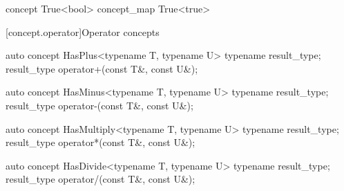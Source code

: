 \documentclass[american,twoside]{book}
\begin{document}
\begin{itemdecl}
concept True<bool> { }
concept_map True<true> { }
\end{itemdecl}

\begin{itemdescr}
\pnum
{}

\pnum
{}
\end{itemdescr}

[concept.operator]{Operator concepts}
\begin{itemdecl}
auto concept HasPlus<typename T, typename U> {
  typename result_type;
  result_type operator+(const T&, const U&);
}
\end{itemdecl}

\begin{itemdescr}
\pnum
{}
\end{itemdescr}

\begin{itemdecl}
auto concept HasMinus<typename T, typename U> {
  typename result_type;
  result_type operator-(const T&, const U&);
}
\end{itemdecl}

\begin{itemdescr}
\pnum
{}
\end{itemdescr}

\begin{itemdecl}
auto concept HasMultiply<typename T, typename U> {
  typename result_type;
  result_type operator*(const T&, const U&);
}
\end{itemdecl}

\begin{itemdescr}
\pnum
{}
\end{itemdescr}

\begin{itemdecl}
auto concept HasDivide<typename T, typename U> {
  typename result_type;
  result_type operator/(const T&, const U&);
}
\end{itemdecl}

\begin{itemdescr}
\pnum
{}
\end{itemdescr}
\end{document}
